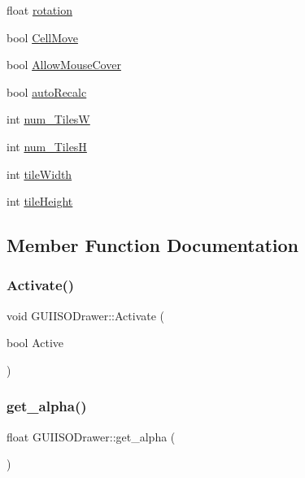 \begin{DoxyCompactItemize}
float \hyperlink{class_g_u_i_i_s_o_drawer_af9a277d9f0fbc5920aad728db34c6ef2}{rotation}
\item 
bool \hyperlink{class_g_u_i_i_s_o_drawer_aba5b0aea2a73532d855458ab161b6e16}{Cell\+Move}
\item 
bool \hyperlink{class_g_u_i_i_s_o_drawer_a3b8ea70cb598d2efb5729f33b5f4e008}{Allow\+Mouse\+Cover}
\item 
bool \hyperlink{class_g_u_i_i_s_o_drawer_ac30d3c7491721688050abcaa66941a3e}{auto\+Recalc}
\item 
int \hyperlink{class_g_u_i_i_s_o_drawer_a27d4e967a9c83d590de7b9022f513bd7}{num\+\_\+\+TilesW}
\item 
int \hyperlink{class_g_u_i_i_s_o_drawer_a5e8321341694f11ab524c2254e80c1a5}{num\+\_\+\+TilesH}
\item 
int \hyperlink{class_g_u_i_i_s_o_drawer_aa3b12ba8c645d1eed1da2181e15f9e5e}{tile\+Width}
\item 
int \hyperlink{class_g_u_i_i_s_o_drawer_a02557b788f2fb2cf609e0bfd68aec1c8}{tile\+Height}
\end{DoxyCompactItemize}


\subsection{Member Function Documentation}
\hypertarget{class_g_u_i_i_s_o_drawer_af097d861d09c8567045381e3b00eec8d}{}\label{class_g_u_i_i_s_o_drawer_af097d861d09c8567045381e3b00eec8d} 
\subsubsection{\texorpdfstring{Activate()}{Activate()}}
{\footnotesize\ttfamily void G\+U\+I\+I\+S\+O\+Drawer\+::\+Activate (\begin{DoxyParamCaption}\item[{bool}]{Active }\end{DoxyParamCaption})}

\hypertarget{class_g_u_i_i_s_o_drawer_a07b6a15a8e508baef535ae1018cd0ec5}{}\label{class_g_u_i_i_s_o_drawer_a07b6a15a8e508baef535ae1018cd0ec5} 
\subsubsection{\texorpdfstring{get\+\_\+alpha()}{get\_alpha()}}
{\footnotesize\ttfamily float G\+U\+I\+I\+S\+O\+Drawer\+::get\+\_\+alpha (\begin{DoxyParamCaption}{ }\end{DoxyParamCaption})}

